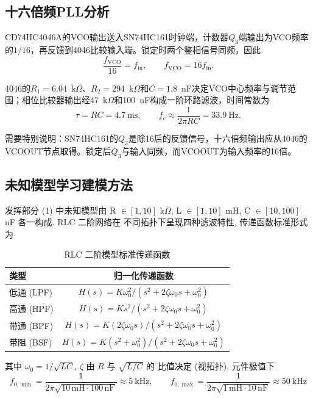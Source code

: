 \documentclass[a4paper]{article}
\begin{document}
\subsection{十六倍频PLL分析}

CD74HC4046A的VCO输出送入SN74HC161时钟端，计数器$Q_3$端输出为VCO频率的$1/16$，再反馈到4046比较输入端。锁定时两个鉴相信号同频，因此
\begin{equation}
\frac{f_{\mathrm{VCO}}}{16}=f_{\mathrm{in}},\qquad f_{\mathrm{VCO}}=16f_{\mathrm{in}}.
\end{equation}

4046的$R_1=6.04$~k$\Omega$、$R_2=294$~k$\Omega$和$C=1.8$~nF决定VCO中心频率与调节范围；相位比较器输出经47~k$\Omega$和100~nF构成一阶环路滤波，时间常数为
\begin{equation}
\tau=RC=4.7~\mathrm{ms},\qquad f_c\approx\frac{1}{2\pi RC}=33.9~\mathrm{Hz}.
\end{equation}

需要特别说明：SN74HC161的$Q_3$是除16后的反馈信号，十六倍频输出应从4046的VCOOUT节点取得。锁定后$Q_3$与输入同频，而VCOOUT为输入频率的16倍。

\subsection{未知模型学习建模方法}

发挥部分 (1) 中未知模型由 R $\in [1, 10]$ k$\Omega$,
L $\in [1, 10]$ mH, C $\in [10, 100]$ nF 各一构成. RLC 二阶网络在
不同拓扑下呈现四种滤波特性, 传递函数标准形式为

\begin{table}[H]
\centering
\caption{RLC 二阶模型标准传递函数}
\begin{tabular}{lc}
\toprule
类型 & 归一化传递函数 \\
\midrule
低通 (LPF) & $H(s) = K\omega_{0}^{2} / (s^{2} + 2\zeta\omega_{0}s + \omega_{0}^{2})$ \\[3pt]
高通 (HPF) & $H(s) = K s^{2}     / (s^{2} + 2\zeta\omega_{0}s + \omega_{0}^{2})$ \\[3pt]
带通 (BPF) & $H(s) = K (2\zeta\omega_{0} s) / (s^{2} + 2\zeta\omega_{0}s + \omega_{0}^{2})$ \\[3pt]
带阻 (BSF) & $H(s) = K (s^{2} + \omega_{0}^{2}) / (s^{2} + 2\zeta\omega_{0}s + \omega_{0}^{2})$ \\
\bottomrule
\end{tabular}
\end{table}

其中 $\omega_{0} = 1/\sqrt{LC}$, $\zeta$ 由 $R$ 与 $\sqrt{L/C}$ 的
比值决定 (视拓扑). 元件极值下
\[
f_{0,\min} = \frac{1}{2\pi\sqrt{10\,\mathrm{mH}\cdot 100\,\mathrm{nF}}}
           \approx 5\ \mathrm{kHz}, \qquad
f_{0,\max} = \frac{1}{2\pi\sqrt{1\,\mathrm{mH}\cdot 10\,\mathrm{nF}}}
           \approx 50\ \mathrm{kHz}
\]
\end{document}
